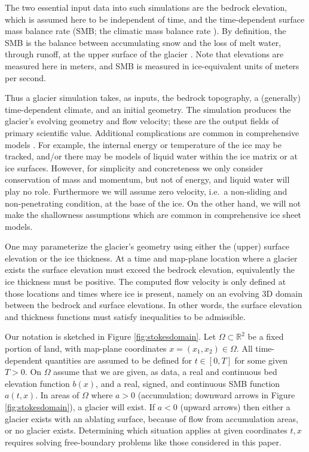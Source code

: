 \documentclass[hidelinks,onefignum,onetabnum,final]{siamart220329}  %
\newcommand{\RR}{\mathbb{R}}
\begin{document}
The two essential input data into such simulations are the bedrock elevation, which is assumed here to be independent of time, and the time-dependent surface mass balance rate (SMB; the climatic mass balance rate \cite{Cogleyetal2011}).  By definition, the SMB is the balance between accumulating snow and the loss of melt water, through runoff, at the upper surface of the glacier \cite{Cogleyetal2011}.  Note that elevations are measured here in meters, and SMB is measured in ice-equivalent units of meters per second.

Thus a glacier simulation takes, as inputs, the bedrock topography, a (generally) time-dependent climate, and an initial geometry.  The simulation produces the glacier's evolving geometry and flow velocity; these are the output fields of primary scientific value.  Additional complications are common in comprehensive models \cite{SchoofHewitt2013,Winkelmannetal2011}.  For example, the internal energy \cite{Aschwandenetal2012} or temperature of the ice may be tracked, and/or there may be models of liquid water within the ice matrix or at ice surfaces.  However, for simplicity and concreteness we only consider conservation of mass and momentum, but not of energy, and liquid water will play no role.  Furthermore we will assume zero velocity, i.e.~a non-sliding and non-penetrating condition, at the base of the ice.  On the other hand, we will not make the shallowness assumptions which are common in comprehensive ice sheet models.

One may parameterize the glacier's geometry using either the (upper) surface elevation or the ice thickness.  At a time and map-plane location where a glacier exists the surface elevation must exceed the bedrock elevation, equivalently the ice thickness must be positive.  The computed flow velocity is only defined at those locations and times where ice is present, namely on an evolving 3D domain between the bedrock and surface elevations.  In other words, the surface elevation and thickness functions must satisfy inequalities to be admissible.

Our notation is sketched in Figure \ref{fig:stokesdomain}.  Let $\Omega \subset \RR^2$ be a fixed portion of land, with map-plane coordinates $x=(x_1,x_2)\in\Omega$.  All time-dependent quantities are assumed to be defined for $t\in [0,T]$ for some given $T>0$.  On $\Omega$ assume that we are given, as data, a real and continuous bed elevation function $b(x)$, and a real, signed, and continuous SMB function $a(t,x)$.  In areas of $\Omega$ where $a>0$ (accumulation; downward arrows in Figure \ref{fig:stokesdomain}), a glacier will exist.  If $a<0$ (upward arrows) then either a glacier exists with an ablating surface, because of flow from accumulation areas, or no glacier exists.  Determining which situation applies at given coordinates $t,x$ requires solving free-boundary problems like those considered in this paper.
\end{document}
